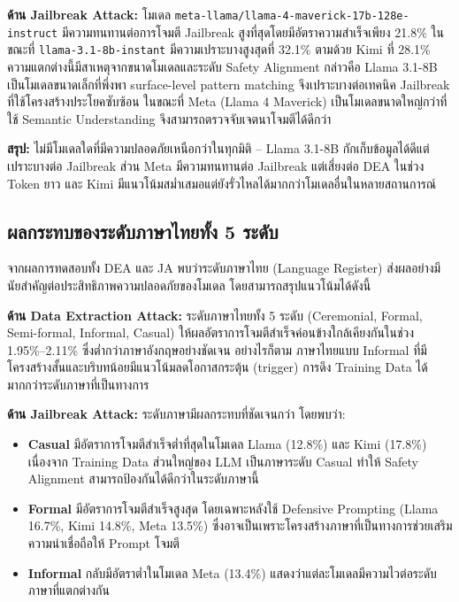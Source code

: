 \textbf{ด้าน Jailbreak Attack:}
โมเดล \texttt{meta-llama/llama-4-maverick-17b-128e-instruct} มีความทนทานต่อการโจมตี Jailbreak สูงที่สุดโดยมีอัตราความสำเร็จเพียง 21.8\% ในขณะที่ \texttt{llama-3.1-8b-instant} มีความเปราะบางสูงสุดที่ 32.1\% ตามด้วย Kimi ที่ 28.1\% ความแตกต่างนี้มีสาเหตุจากขนาดโมเดลและระดับ Safety Alignment กล่าวคือ Llama 3.1-8B เป็นโมเดลขนาดเล็กที่พึ่งพา surface-level pattern matching จึงเปราะบางต่อเทคนิค Jailbreak ที่ใช้โครงสร้างประโยคซับซ้อน ในขณะที่ Meta (Llama 4 Maverick) เป็นโมเดลขนาดใหญ่กว่าที่ใช้ Semantic Understanding จึงสามารถตรวจจับเจตนาโจมตีได้ดีกว่า

\textbf{สรุป:} ไม่มีโมเดลใดที่มีความปลอดภัยเหนือกว่าในทุกมิติ -- Llama 3.1-8B กักเก็บข้อมูลได้ดีแต่เปราะบางต่อ Jailbreak ส่วน Meta มีความทนทานต่อ Jailbreak แต่เสี่ยงต่อ DEA ในช่วง Token ยาว และ Kimi มีแนวโน้มสม่ำเสมอแต่ยังรั่วไหลได้มากกว่าโมเดลอื่นในหลายสถานการณ์

\subsection{ผลกระทบของระดับภาษาไทยทั้ง 5 ระดับ}

จากผลการทดสอบทั้ง DEA และ JA พบว่าระดับภาษาไทย (Language Register) ส่งผลอย่างมีนัยสำคัญต่อประสิทธิภาพความปลอดภัยของโมเดล โดยสามารถสรุปแนวโน้มได้ดังนี้

\textbf{ด้าน Data Extraction Attack:}
ระดับภาษาไทยทั้ง 5 ระดับ (Ceremonial, Formal, Semi-formal, Informal, Casual) ให้ผลอัตราการโจมตีสำเร็จค่อนข้างใกล้เคียงกันในช่วง 1.95\%--2.11\% ซึ่งต่ำกว่าภาษาอังกฤษอย่างชัดเจน อย่างไรก็ตาม ภาษาไทยแบบ Informal ที่มีโครงสร้างสั้นและบริบทน้อยมีแนวโน้มลดโอกาสกระตุ้น (trigger) การดึง Training Data ได้มากกว่าระดับภาษาที่เป็นทางการ

\textbf{ด้าน Jailbreak Attack:}
ระดับภาษามีผลกระทบที่ชัดเจนกว่า โดยพบว่า:
\begin{itemize}
    \item \textbf{Casual} มีอัตราการโจมตีสำเร็จต่ำที่สุดในโมเดล Llama (12.8\%) และ Kimi (17.8\%) เนื่องจาก Training Data ส่วนใหญ่ของ LLM เป็นภาษาระดับ Casual ทำให้ Safety Alignment สามารถป้องกันได้ดีกว่าในระดับภาษานี้
    \item \textbf{Formal} มีอัตราการโจมตีสำเร็จสูงสุด โดยเฉพาะหลังใช้ Defensive Prompting (Llama 16.7\%, Kimi 14.8\%, Meta 13.5\%) ซึ่งอาจเป็นเพราะโครงสร้างภาษาที่เป็นทางการช่วยเสริมความน่าเชื่อถือให้ Prompt โจมตี
    \item \textbf{Informal} กลับมีอัตราต่ำในโมเดล Meta (13.4\%) แสดงว่าแต่ละโมเดลมีความไวต่อระดับภาษาที่แตกต่างกัน
\end{itemize}


